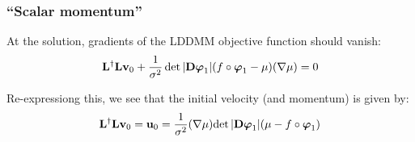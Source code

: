 

\begin{frame}
\frametitle{``Scalar momentum''}
At the solution, gradients of the LDDMM objective function should vanish:
\begin{align*}
{\bf L}^{\dagger}{\bf L} {\bf v}_{0} + \frac{1}{\sigma^2} \det | {\bf D}{\boldsymbol\varphi}_{1} | (f \circ {\boldsymbol\varphi}_1 - \mu)(\nabla \mu) = 0
\end{align*}

Re-expressiong this, we see that the initial velocity (and momentum) is given by:
\begin{align*}
{\bf L}^{\dagger}{\bf L} {\bf v}_{0} = {\bf u}_0 = {\frac{1}{\sigma^2} (\nabla \mu)} {\det | {\bf D}{\boldsymbol\varphi}_{1} | (\mu - f \circ {\boldsymbol\varphi}_1)}
\end{align*}
\end{frame}

